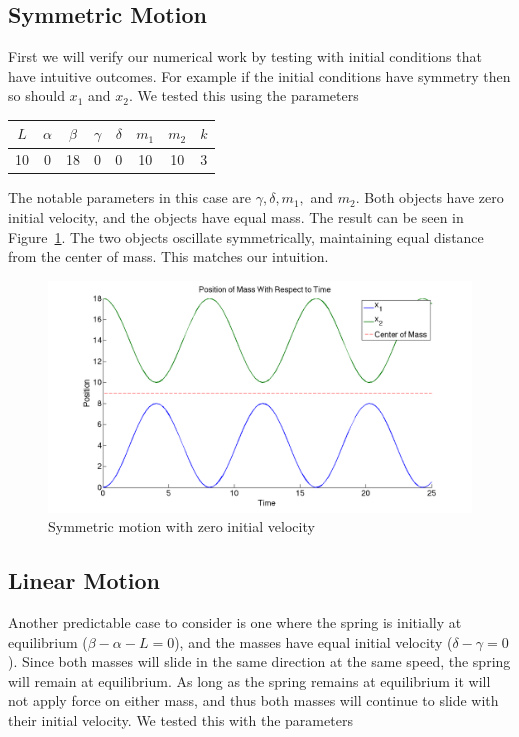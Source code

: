 \documentclass[11pt, oneside]{article}   	%
\begin{document}
\subsection{Symmetric Motion}
First we will verify our numerical work by testing with initial conditions that have intuitive outcomes.
For example if the initial conditions have symmetry then so should $x_1$ and $x_2$.
We tested this using the parameters
\begin{center}

\begin{tabular}{| c | c | c | c | c | c | c | c |}

\hline

$L$ & $\alpha$ & $\beta$ & $\gamma$ & $\delta$ & $m_1$ & $m_2$ & $k$ \\

\hline

 10 & 0 & 18 & 0 & 0 & 10 & 10 & 3\\

\hline

\end{tabular}

\end{center}

The notable parameters in this case are $\gamma, \delta, m_1, $ and $m_2$.
Both objects have zero initial velocity, and the objects have equal mass.
The result can be seen in Figure~\ref{sanity1}.
The two objects oscillate symmetrically, maintaining equal distance from the center of mass.
This matches our intuition.

\begin{figure}[h!]
\centering \includegraphics[scale=0.3]{sanity1}
\caption{\label{sanity1} Symmetric motion with zero initial velocity}
\end{figure}

\subsection{Linear Motion}
Another predictable case to consider is one where the spring is initially at equilibrium ($\beta - \alpha - L = 0$), and the masses have equal initial velocity ($\delta-\gamma=0$).
Since both masses will slide in the same direction at the same speed, the spring will remain at equilibrium.
As long as the spring remains at equilibrium it will not apply force on either mass, and thus both masses will continue to slide with their initial velocity.
We tested this with the parameters
\end{document}
